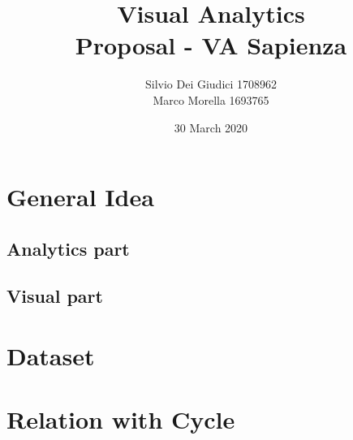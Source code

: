 \documentclass[a4paper, 11pt]{article}
\title { Visual Analytics\\ \bigskip \large Proposal - VA Sapienza}
\date{30 March 2020}
\author{Silvio Dei Giudici 1708962 \\ Marco Morella 1693765}
\begin{document}
\maketitle

\section{General Idea}
\subsection{Analytics part}
\subsection{Visual part}

\section{Dataset}

\section{Relation with Cycle}
\end{document}
